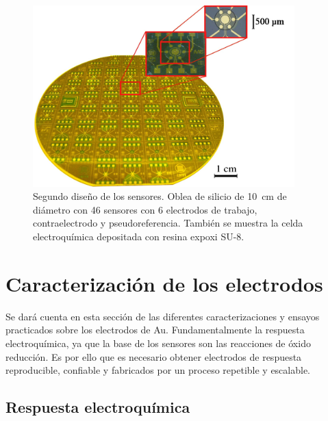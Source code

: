 {					  %
					  \begin{figure}[h!]
					  \begin{center}
					  \includegraphics[width=0.90\textwidth]{Imagenes/ObleaV2.jpg}
					  \caption[Electrodos, segunda versión]{Segundo diseño de los sensores. Oblea de silicio de \SI{10}{cm} de diámetro con 46 sensores con 6 electrodos de trabajo, contraelectrodo y pseudoreferencia. También se muestra la celda electroquímica depositada con resina expoxi SU-8.}
					  \label{fig:ObleaV2}
					  \end{center}
					  \end{figure} 	
	
		\section{Caracterización de los electrodos}

		 Se dará cuenta en esta sección de las diferentes caracterizaciones y ensayos practicados sobre los electrodos de Au. Fundamentalmente la respuesta electroquímica, ya que la base de los sensores son las reacciones de óxido reducción. Es por ello que es necesario obtener electrodos de respuesta reproducible, confiable y fabricados por un proceso repetible y escalable. 

	\subsection{Respuesta electroquímica}\label{sec:respuesta_sondas_au}
			 		
}
